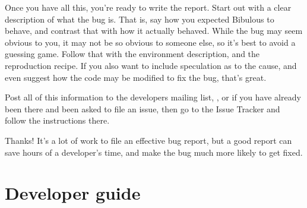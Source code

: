 \documentclass[letterpaper,10pt,english]{sphinxmanual}
\begin{document}
Once you have all this, you're ready to write the report. Start out with a clear description of what the bug is. That is, say how you expected Bibulous to behave, and contrast that with how it actually behaved. While the bug may seem obvious to you, it may not be so obvious to someone else, so it's best to avoid a guessing game. Follow that with the environment description, and the reproduction recipe. If you also want to include speculation as to the cause, and even suggest how the code may be modified to fix the bug, that's great.

Post all of this information to the developers mailing list, , or if you have already been there and been asked to file an issue, then go to the Issue Tracker and follow the instructions there.

Thanks! It's a lot of work to file an effective bug report, but a good report can save hours of a developer's time, and make the bug much more likely to get fixed.


\chapter{Developer guide}
\label{developer_guide::doc}\label{developer_guide:developer-guide}
\end{document}
